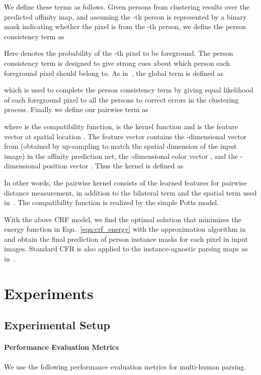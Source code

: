 \documentclass[10pt, letterpaper]{article}
\begin{document}
We define these terms as follows. Given  persons from clustering results over the predicted affinity map, and assuming the -th person is represented by a binary mask  indicating whether the pixel is from the -th person, we define the person consistency term  as

Here  denotes the probability of the -th pixel to be foreground. The person consistency term is designed to give strong cues about which person each foreground pixel should belong to. As in~\cite{arnab2017pixelwise,li2017holistic}, the global term  is defined as 

which is used to complete the person consistency term by giving equal likelihood of each foreground pixel to all the persons to correct errors in the clustering process. Finally we define our pairwise term as

where  is the compatibility function,  is the kernel function and  is the feature vector at spatial location . The feature vector contains the -dimensional vector from  (obtained by up-sampling  to match the spatial dimension of the input image) in the affinity prediction net, the -dimensional color vector , and the -dimensional position vector . Thus the kernel is defined as 

In other words, the pairwise kernel consists of the learned features for pairwise distance measurement, in addition to the bilateral term and the spatial term used in~\cite{krahenbuhl2011efficient}. The compatibility function is realized by the simple Potts model.

With the above CRF model, we find the optimal solution that minimizes the energy function in Eqn.~\eqref{eqn:crf_energy} with the approximation algorithm in~\cite{krahenbuhl2011efficient} and obtain the final prediction of person instance masks for each pixel in input images. Standard CFR is also applied to the instance-agnostic parsing maps as in~\cite{chen2016deeplab}. 

\section{Experiments}
\subsection{Experimental Setup}
\paragraph{Performance Evaluation Metrics}
We use the following performance evaluation metrics for multi-human parsing. 
\end{document}
